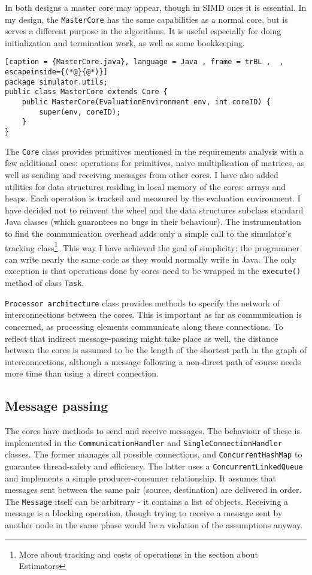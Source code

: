 \documentclass[12pt,a4paper,twoside,openright]{report}
\begin{document}
In both designs a master core may appear, though in SIMD ones it is essential. In my design, the \texttt{MasterCore} has the same capabilities as a normal core, but is serves a different purpose in the algorithms. It is useful especially for doing initialization and termination work, as well as some bookkeeping.

\begin{lstlisting}[caption = {MasterCore.java}, language = Java , frame = trBL ,  , escapeinside={(*@}{@*)}]
package simulator.utils;
public class MasterCore extends Core {
    public MasterCore(EvaluationEnvironment env, int coreID) {
        super(env, coreID);
    }
}
\end{lstlisting}

The \texttt{Core} class provides primitives mentioned in the requirements analysis with a few additional ones: operations for primitives, naive multiplication of matrices, as well as sending and receiving messages from other cores. I have also added utilities for data structures residing in local memory of the cores: arrays and heaps. Each operation is tracked and measured by the evaluation environment. I have decided not to reinvent the wheel and the data structures subclass standard Java classes (which guarantees no bugs in their behaviour). The instrumentation to find the communication overhead adds only a simple call to the simulator's tracking class\footnote{More about tracking and costs of operations in the section about Estimators}. This way I have achieved the goal of simplicity: the programmer can write nearly the same code as they would normally write in Java. The only exception is that operations done by cores need to be wrapped in the \texttt{execute()} method of class \texttt{Task}.

\texttt{Processor architecture} class provides methods to specify the network of interconnections between the cores. This is important as far as communication is concerned, as processing elements communicate along these connections. To reflect that indirect message-passing might take place as well, the distance between the cores is assumed to be the length of the shortest path in the graph of interconnections, although a message following a non-direct path of course needs more time than using a direct connection.

\subsection{Message passing}
The cores have methods to send and receive messages. The behaviour of these is implemented in the \texttt{CommunicationHandler} and \texttt{SingleConnectionHandler} classes. The former manages all possible connections, and \texttt{ConcurrentHashMap} to guarantee thread-safety and efficiency. The latter uses a \texttt{ConcurrentLinkedQueue} and implements a simple producer-consumer relationship. It assumes that messages sent between the same pair (source, destination) are delivered in order. The \texttt{Message} itself can be arbitrary - it contains a list of objects. Receiving a message is a blocking operation, though trying to receive a message sent by another node in the same phase would be a violation of the assumptions anyway.
\end{document}
